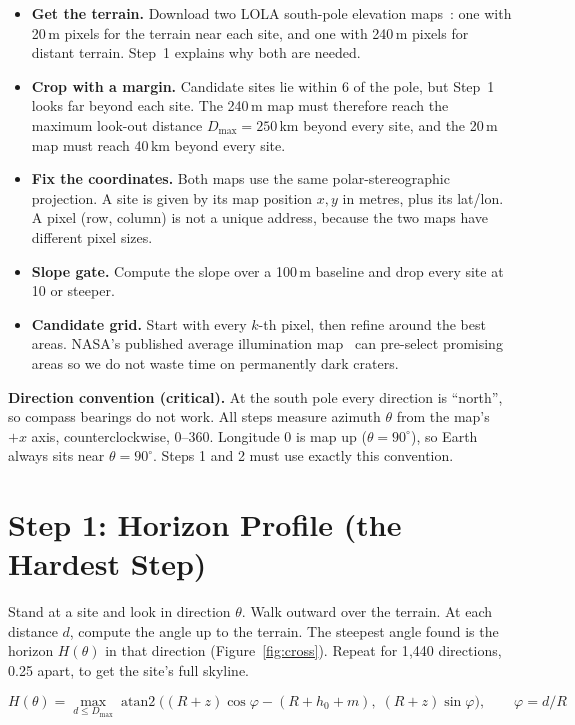 \documentclass[11pt,a4paper]{article}
\begin{document}
\begin{itemize}
  \item \textbf{Get the terrain.} Download two LOLA south-pole elevation maps~\cite{lola}: one with 20\,m pixels for the terrain near each site, and one with 240\,m pixels for distant terrain. Step~1 explains why both are needed.
  \item \textbf{Crop with a margin.} Candidate sites lie within 6\textdegree{} of the pole, but Step~1 looks far beyond each site. The 240\,m map must therefore reach the maximum look-out distance $D_{\max} = 250$\,km beyond every site, and the 20\,m map must reach 40\,km beyond every site.
  \item \textbf{Fix the coordinates.} Both maps use the same polar-stereographic projection. A site is given by its map position $x, y$ in metres, plus its lat/lon. A pixel (row, column) is not a unique address, because the two maps have different pixel sizes.
  \item \textbf{Slope gate.} Compute the slope over a 100\,m baseline and drop every site at 10\textdegree{} or steeper.
  \item \textbf{Candidate grid.} Start with every $k$-th pixel, then refine around the best areas. NASA's published average illumination map~\cite{pgda} can pre-select promising areas so we do not waste time on permanently dark craters.
\end{itemize}

\textbf{Direction convention (critical).} At the south pole every direction is ``north'', so compass bearings do not work. All steps measure azimuth $\theta$ from the map's $+x$ axis, counterclockwise, 0--360\textdegree. Longitude 0 is map up ($\theta = 90^\circ$), so Earth always sits near $\theta = 90^\circ$. Steps 1 and 2 must use exactly this convention.

\section{Step 1: Horizon Profile (the Hardest Step)}

Stand at a site and look in direction $\theta$. Walk outward over the terrain. At each distance $d$, compute the angle up to the terrain. The steepest angle found is the horizon $H(\theta)$ in that direction (Figure~\ref{fig:cross}). Repeat for 1{,}440 directions, 0.25\textdegree{} apart, to get the site's full skyline.

\begin{equation}
H(\theta) = \max_{d \le D_{\max}} \operatorname{atan2}\!\Big( (R+z)\cos\varphi - (R+h_0+m),\; (R+z)\sin\varphi \Big),
\qquad \varphi = d/R
\label{eq:horizon}
\end{equation}
\end{document}
